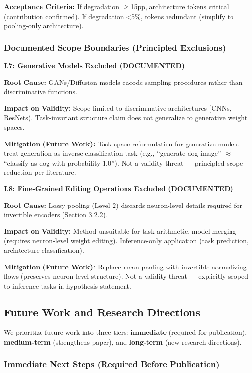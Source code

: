 \textbf{Acceptance Criteria:} If degradation $\geq$15pp, architecture tokens critical (contribution confirmed). If degradation <5\%, tokens redundant (simplify to pooling-only architecture).

\subsubsection{Documented Scope Boundaries (Principled Exclusions)}

\textbf{L7: Generative Models Excluded (DOCUMENTED)}

\textbf{Root Cause:} GANs/Diffusion models encode sampling procedures rather than discriminative functions.

\textbf{Impact on Validity:} Scope limited to discriminative architectures (CNNs, ResNets). Task-invariant structure claim does not generalize to generative weight spaces.

\textbf{Mitigation (Future Work):} Task-space reformulation for generative models --- treat generation as inverse-classification task (e.g., ``generate dog image'' $\approx$ ``classify as dog with probability 1.0''). Not a validity threat --- principled scope reduction per literature.

\textbf{L8: Fine-Grained Editing Operations Excluded (DOCUMENTED)}

\textbf{Root Cause:} Lossy pooling (Level 2) discards neuron-level details required for invertible encoders (Section 3.2.2).

\textbf{Impact on Validity:} Method unsuitable for task arithmetic, model merging (requires neuron-level weight editing). Inference-only application (task prediction, architecture classification).

\textbf{Mitigation (Future Work):} Replace mean pooling with invertible normalizing flows (preserves neuron-level structure). Not a validity threat --- explicitly scoped to inference tasks in hypothesis statement.

\subsection{Future Work and Research Directions}

We prioritize future work into three tiers: \textbf{immediate} (required for publication), \textbf{medium-term} (strengthens paper), and \textbf{long-term} (new research directions).

\subsubsection{Immediate Next Steps (Required Before Publication)}

